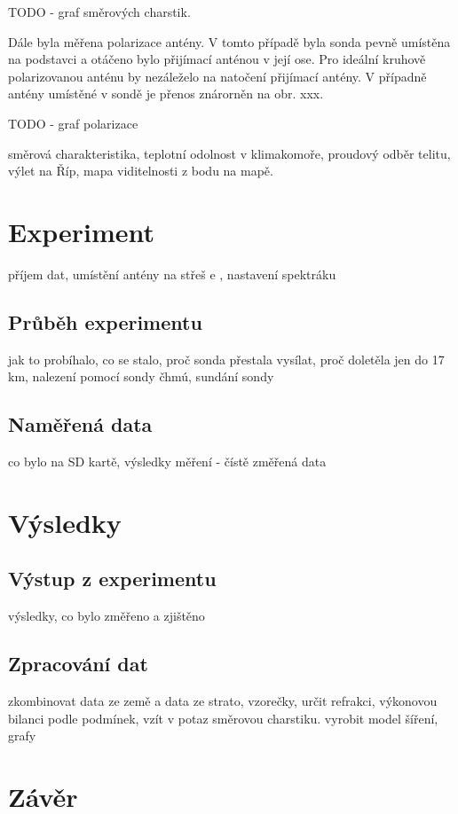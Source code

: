 \documentclass[twoside]{ctuthesis}
\theoremstyle{plain}
\theoremstyle{definition}
\theoremstyle{note}
\begin{document}
	TODO - graf směrových charstik.

	Dále byla měřena polarizace antény. V tomto případě byla sonda pevně umístěna na podstavci a otáčeno bylo přijímací anténou v její ose. Pro ideální kruhově polarizovanou anténu by nezáleželo na natočení přijímací antény. V případně antény umístěné v sondě je přenos znárorněn na obr. xxx.

	TODO - graf polarizace


	směrová charakteristika, teplotní odolnost v klimakomoře, proudový odběr telitu, výlet na Říp, mapa viditelnosti z bodu na mapě. 




\chapter{Experiment}
příjem dat, umístění antény na střeš e , nastavení spektráku
	\section{Průběh experimentu}
	jak to probíhalo, co se stalo, proč sonda přestala vysílat, proč doletěla jen do 17 km, nalezení pomocí sondy čhmú, sundání sondy

	\section{Naměřená data}
	co bylo na SD kartě, výsledky měření - čístě změřená data



\chapter{Výsledky}
	\section{Výstup z experimentu}
	výsledky, co bylo změřeno a zjištěno

	\section{Zpracování dat}
	zkombinovat data ze země a data ze strato, vzorečky, určit refrakci, výkonovou bilanci podle podmínek, vzít v potaz směrovou charstiku. vyrobit model šíření, grafy

	



\chapter{Závěr}
\end{document}
